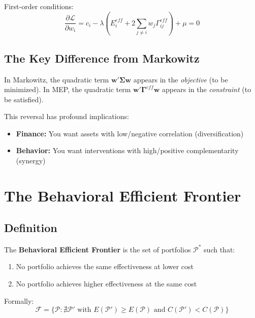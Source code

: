 First-order conditions:
\begin{equation}
\frac{\partial \mathcal{L}}{\partial w_i} = c_i - \lambda \left( E_i^{eff} + 2 \sum_{j \neq i} w_j \Gamma^{eff}_{ij} \right) + \mu = 0
\label{eq:foc}
\end{equation}

\subsection{The Key Difference from Markowitz}

In Markowitz, the quadratic term $\mathbf{w}'\boldsymbol{\Sigma}\mathbf{w}$ appears in the
\textit{objective} (to be minimized). In MEP, the quadratic term
$\mathbf{w}'\boldsymbol{\Gamma}^{eff}\mathbf{w}$ appears in the \textit{constraint}
(to be satisfied).

This reversal has profound implications:
\begin{itemize}
\item \textbf{Finance:} You want assets with low/negative correlation (diversification)
\item \textbf{Behavior:} You want interventions with high/positive complementarity (synergy)
\end{itemize}


\section{The Behavioral Efficient Frontier}
\label{sec:mep-frontier}

\subsection{Definition}

\begin{definition}
\label{def:frontier}
The \textbf{Behavioral Efficient Frontier} is the set of portfolios $\mathcal{P}^*$
such that:
\begin{enumerate}
\item No portfolio achieves the same effectiveness at lower cost
\item No portfolio achieves higher effectiveness at the same cost
\end{enumerate}
Formally:
\begin{equation}
\mathcal{F} = \{ \mathcal{P} : \nexists \mathcal{P}' \text{ with } E(\mathcal{P}') \geq E(\mathcal{P}) \text{ and } C(\mathcal{P}') < C(\mathcal{P}) \}
\end{equation}
\end{definition}


